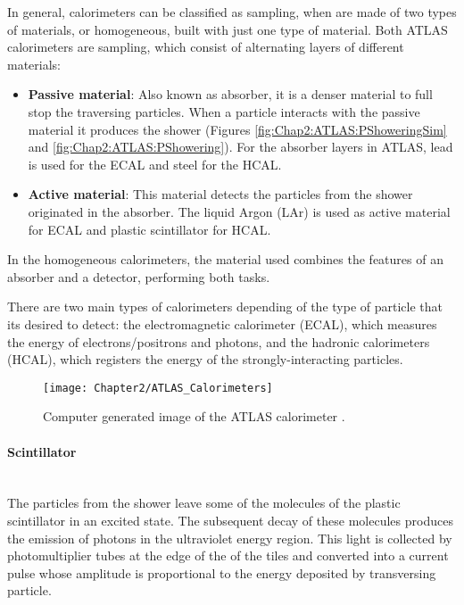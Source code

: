 In general, calorimeters can be classified as sampling, when are made of two types of materials, 
or homogeneous, built with just one type of material.
Both ATLAS calorimeters are sampling, which consist of alternating layers of different materials:
\begin{itemize}
	\item \textbf{Passive material}: Also known as absorber, it is a denser material to full stop the traversing particles.
		When a particle interacts with the passive material it produces the shower (Figures \ref{fig:Chap2:ATLAS:PShoweringSim} 
		and \ref{fig:Chap2:ATLAS:PShowering}).
		For the absorber layers in ATLAS, lead is used for the ECAL and steel for the HCAL.
	\item \textbf{Active material}: This material detects the particles from the shower originated in the absorber.
		The liquid Argon (LAr) is used as active material for ECAL and plastic scintillator for HCAL.
\end{itemize}
In the homogeneous calorimeters, the material used combines the features of an absorber and a detector, performing both tasks.

There are two main types of calorimeters depending of the type of particle that its desired to detect: 
the electromagnetic calorimeter (ECAL), which measures the energy of electrons/positrons and photons, 
and the hadronic calorimeters (HCAL), which registers the energy of the strongly-interacting particles. 


\begin{figure}
	\centering
 	 \texttt{[image: Chapter2/ATLAS\_Calorimeters]}
	 \caption{Computer generated image of the ATLAS calorimeter \cite{ATLAS_Web_Detectors}.}
	\label{fig:Chap2:ATLAS:Calorimeters}
\end{figure}

\paragraph{Scintillator}\mbox{}\\
The particles from the shower leave some of the molecules of the plastic scintillator in an excited state. The 
subsequent decay of these molecules produces the emission of photons in the ultraviolet energy region.
This light is collected by photomultiplier tubes at the edge of the of the tiles
and converted into a current pulse whose amplitude is proportional
to the energy deposited by transversing particle.



